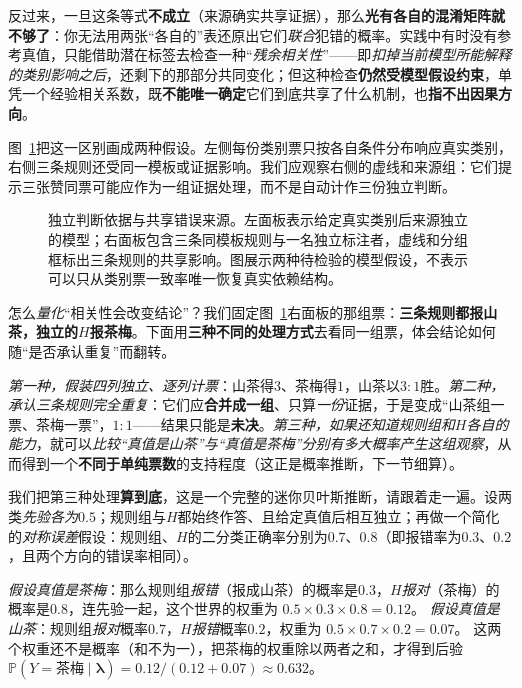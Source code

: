 反过来，一旦这条等式\textbf{不成立}（来源确实共享证据），那么\textbf{光有各自的混淆矩阵就不够了}：你无法用两张“各自的”表还原出它们\emph{联合}犯错的概率。实践中有时没有参考真值，只能借助潜在标签去检查一种“\emph{残余相关性}”——即\emph{扣掉当前模型所能解释的类别影响之后}，还剩下的那部分共同变化；但这种检查\textbf{仍然受模型假设约束}，单凭一个经验相关系数，既\textbf{不能唯一确定}它们到底共享了什么机制，也\textbf{指不出因果方向}。

图~\ref{fig:knowledge-fusion-source-dependence}把这一区别画成两种假设。左侧每份类别票只按各自条件分布响应真实类别，右侧三条规则还受同一模板或证据影响。我们应观察右侧的虚线和来源组：它们提示三张赞同票可能应作为一组证据处理，而不是自动计作三份独立判断。

\begin{figure}[htbp]
  \centering
  
  \caption{独立判断依据与共享错误来源。左面板表示给定真实类别后来源独立的模型；右面板包含三条同模板规则与一名独立标注者，虚线和分组框标出三条规则的共享影响。图展示两种待检验的模型假设，不表示可以只从类别票一致率唯一恢复真实依赖结构。}
  \label{fig:knowledge-fusion-source-dependence}
\end{figure}
\FloatBarrier

怎么\emph{量化}“相关性会改变结论”？我们固定图~\ref{fig:knowledge-fusion-source-dependence}右面板的那组票：\textbf{三条规则都报山茶，独立的$H$报茶梅}。下面用\textbf{三种不同的处理方式}去看同一组票，体会结论如何随“是否承认重复”而翻转。

\emph{第一种，假装四列独立、逐列计票}：山茶得$3$、茶梅得$1$，山茶以$3:1$胜。\emph{第二种，承认三条规则完全重复}：它们应\textbf{合并成一组}、只算\emph{一份}证据，于是变成“山茶组一票、茶梅一票”，$1:1$——结果只能是\textbf{未决}。\emph{第三种，如果还知道规则组和$H$各自的能力}，就可以\emph{比较“真值是山茶”与“真值是茶梅”分别有多大概率产生这组观察}，从而得到一个\textbf{不同于单纯票数}的支持程度（这正是概率推断，下一节细算）。

我们把第三种处理\textbf{算到底}，这是一个完整的迷你贝叶斯推断，请跟着走一遍。设两类\emph{先验各为}$0.5$；规则组与$H$都始终作答、且给定真值后相互独立；再做一个简化的\emph{对称误差}假设：规则组、$H$的二分类正确率分别为$0.7$、$0.8$（即报错率为$0.3$、$0.2$，且两个方向的错误率相同）。

\emph{假设真值是茶梅}：那么规则组\emph{报错}（报成山茶）的概率是$0.3$，$H$\emph{报对}（茶梅）的概率是$0.8$，连先验一起，这个世界的权重为
$0.5\times0.3\times0.8=0.12$。
\emph{假设真值是山茶}：规则组\emph{报对}概率$0.7$，$H$\emph{报错}概率$0.2$，权重为
$0.5\times0.7\times0.2=0.07$。
这两个权重还不是概率（和不为一），把茶梅的权重除以两者之和，才得到后验
$\mathbb{P}(Y=\text{茶梅}\mid\bm{\lambda})=0.12/(0.12+0.07)\approx0.632$。

